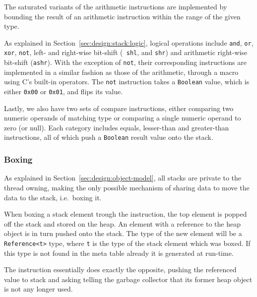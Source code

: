 The saturated variants of the arithmetic instructions are implemented by
bounding the result of an arithmetic instruction within the range of the given
type.

As explained in Section~\ref{sec:design:stack:logic}, logical operations include
{\tt and}, {\tt or}, {\tt xor}, {\tt not}, left- and right-wise bit-shift ({\tt
  shl}, and {\tt shr}) and arithmetic right-wise bit-shift ({\tt ashr}). With
the exception of {\tt not}, their corresponding instructions are implemented in
a similar fashion as those of the arithmetic, through a macro using C's built-in
operators. The {\tt not} instruction takes a {\tt Boolean} value, which is
either {\tt 0x00} or {\tt 0x01}, and flips its value.

Lastly, we also have two sets of compare instructions, either comparing two
numeric operands of matching type or comparing a single numeric operand to zero
(or null). Each category includes equals, lesser-than and greater-than
instructions, all of which push a {\tt Boolean} result value onto the stack.

\subsubsection{Boxing}

As explained in Section~\ref{sec:design:object-model}, all stacks are private to
the thread owning, making the only possible mechanism of sharing data to move
the data to the stack, i.e.~boxing it.

When boxing a stack element trough the  instruction, the top element
is popped off the stack and stored on the heap. An element with a reference to
the heap object is in turn pushed onto the stack. The type of the new element
will be a {\tt Reference<t>} type, where {\tt t} is the type of the stack
element which was boxed. If this type is not found in the meta table already it
is generated at run-time.

The  instruction essentially does exactly the opposite, pushing the
referenced value to stack and asking telling the garbage collector that its
former heap object is not any longer used.

